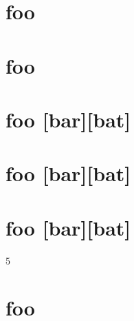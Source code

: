 \part{foo  }
\label{bar}

\part{foo}
\label{bar}

\part{foo [bar][bat]}
\label{foobarbat}

\part{foo [bar][bat]}
\label{bat}

\part{foo [bar][bat]}
\label{baz}

5

\part{foo }
\label{bar}
